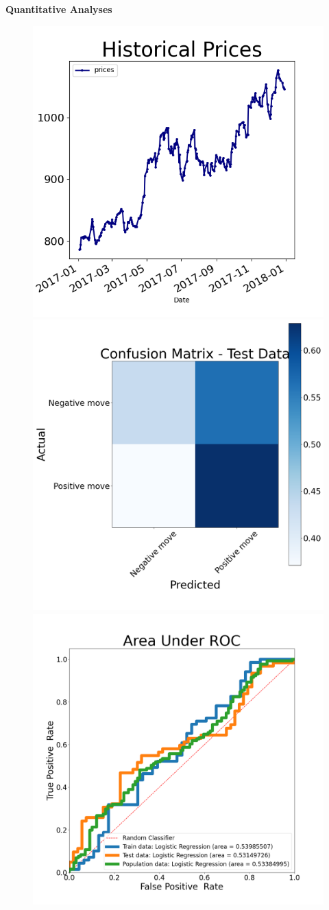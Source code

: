 \documentclass{article}
\begin{document}
\begin{adjustwidth}{-90pt}{-80pt}
\begin{singlespace}
\begin{tcolorbox}[breakable, sharp corners, boxrule=0.7pt]
{\textbf{Quantitative Analyses}
\begin{figure}[H]
\centering
\includegraphics[width=.3\linewidth]{prices.png} \space \space
\includegraphics[width=.3\linewidth]{confmatrix.png} \space \space
\includegraphics[width=.3\linewidth]{roc.png}
\end{figure}

} %

\end{tcolorbox}

\end{singlespace}

\end{adjustwidth}
\end{document}
